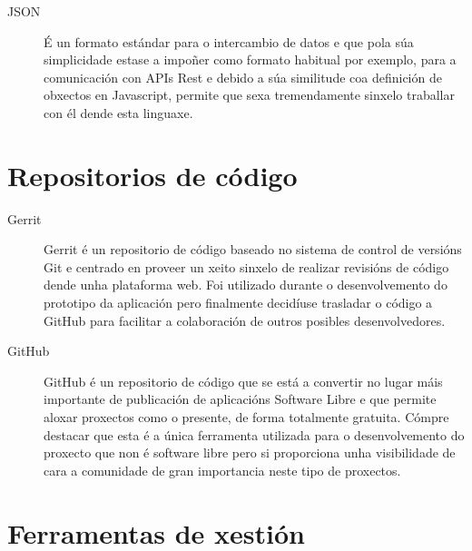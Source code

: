 
  \begin{description}
   \item [JSON] \cite{web:json} É un formato estándar para o 
intercambio de datos e que pola súa 
simplicidade estase a impoñer como formato habitual por exemplo, para a comunicación con 
APIs Rest e debido a súa similitude coa definición de obxectos en Javascript, permite que 
sexa tremendamente sinxelo traballar con él dende esta linguaxe.
  \end{description}

  \section{Repositorios de código}


  \begin{description}
   \item [Gerrit]\cite{web:gerrit} Gerrit é 
un repositorio de código baseado no sistema de control de 
versións Git e centrado en proveer un xeito sinxelo de realizar revisións de 
código dende unha plataforma web. Foi utilizado durante o desenvolvemento do 
prototipo da aplicación pero finalmente decidíuse trasladar o código a GitHub 
para facilitar a colaboración de outros posibles desenvolvedores.
   \item [GitHub]\cite{web:github} GitHub é un repositorio de 
código que se está a convertir no lugar máis 
importante de publicación de aplicacións Software Libre e que permite aloxar proxectos 
como o presente, de forma totalmente gratuita.
  Cómpre destacar que esta é a única ferramenta utilizada para o desenvolvemento do 
proxecto que non é software libre pero si proporciona unha visibilidade de cara a 
comunidade de gran importancia neste tipo de proxectos.
  \end{description}

  \section{Ferramentas de xestión}


